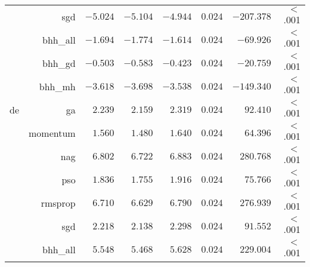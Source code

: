 \begin{table}[htbp]
{\begin{tabular}{lrrrrrrr}
			                     & sgd                  & $-5.024$             & $-5.104$                                        & $-4.944$             & $0.024$              & $-207.378$           & $<$ .001    \\
			                     & bhh\_all             & $-1.694$             & $-1.774$                                        & $-1.614$             & $0.024$              & $-69.926$            & $<$ .001    \\
			                     & bhh\_gd              & $-0.503$             & $-0.583$                                        & $-0.423$             & $0.024$              & $-20.759$            & $<$ .001    \\
			                     & bhh\_mh              & $-3.618$             & $-3.698$                                        & $-3.538$             & $0.024$              & $-149.340$           & $<$ .001    \\
			de                   & ga                   & $2.239$              & $2.159$                                         & $2.319$              & $0.024$              & $92.410$             & $<$ .001    \\
			$ $                  & momentum             & $1.560$              & $1.480$                                         & $1.640$              & $0.024$              & $64.396$             & $<$ .001    \\
			                     & nag                  & $6.802$              & $6.722$                                         & $6.883$              & $0.024$              & $280.768$            & $<$ .001    \\
			                     & pso                  & $1.836$              & $1.755$                                         & $1.916$              & $0.024$              & $75.766$             & $<$ .001    \\
			                     & rmsprop              & $6.710$              & $6.629$                                         & $6.790$              & $0.024$              & $276.939$            & $<$ .001    \\
			                     & sgd                  & $2.218$              & $2.138$                                         & $2.298$              & $0.024$              & $91.552$             & $<$ .001    \\
			                     & bhh\_all             & $5.548$              & $5.468$                                         & $5.628$              & $0.024$              & $229.004$            & $<$ .001    \\

\end{tabular}}
\end{table}
